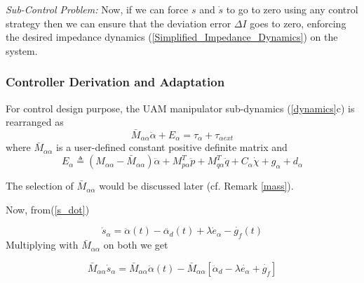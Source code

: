 \documentclass[letterpaper, 10 pt, conference]{ieeeconf}  %
\begin{document}
\textit{Sub-Control Problem:} Now, if we can force $s$ and $\dot s$ to go to zero using any control strategy then we can ensure that the deviation error $\Delta I$  goes to zero, enforcing the desired impedance dynamics (\ref{Simplified_Impedance_Dynamics}) on the system.

\subsubsection{Controller Derivation and Adaptation}

For control design purpose, the UAM manipulator sub-dynamics (\ref{dynamics}c) is rearranged as
\begin{equation} \label{dynamics_alpha}
\bar{M}_{\alpha\alpha}\ddot{\alpha} + E_{\alpha} = \tau_{\alpha}   + \tau_{\alpha{ext}}    
\end{equation}
where $\bar{M}_{\alpha\alpha}$ is a user-defined constant positive definite matrix and  
\begin{equation} \label{Ealpha}
    E_\alpha \triangleq (M_{\alpha\alpha} - \bar{M}_{\alpha\alpha})\ddot{\alpha} +  M_{p\alpha}^T\ddot{p} + M_{q\alpha}^T\ddot{q} + C_\alpha\dot{\chi} + g_\alpha + d_\alpha 
\end{equation}
 

The selection of $\bar{M}_{\alpha \alpha}$ would be discussed later (cf. Remark \ref{mass}).


Now, from(\ref{s_dot}) 

\begin{equation}\label{controller_der_eq1}
    \dot{s}_\alpha = \ddot{\alpha}(t) - \ddot{\alpha_d}(t) + \lambda {\dot e_\alpha} - \dot {g_f}(t)
\end{equation}
Multiplying with $\bar{M}_{\alpha \alpha}$ on both we get

\begin{equation}\label{controller_der_eq2}
    \bar{M}_{\alpha\alpha} \dot s_\alpha = {\bar{M}}_{\alpha\alpha} \ddot{\alpha}(t) - \bar{M}_{\alpha\alpha} [\ddot{\alpha}_d - \lambda {\dot {e_\alpha}} + \dot {g_f}]
\end{equation}
\end{document}
